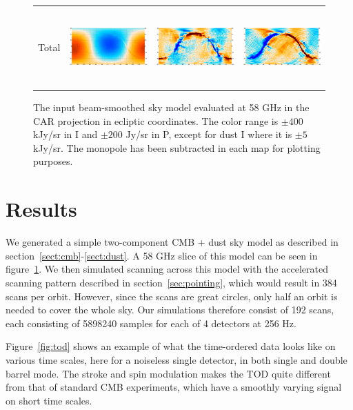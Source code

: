 \documentclass{article}
\begin{document}
\begin{figure}
\begin{tabular}{rm{56mm}m{54.4mm}m{56mm}}
		Total &
		\includegraphics[height=29.7mm,clip,trim=0 0mm 7.5mm 0]{plots/sim_freqmap_58GHz_0_0.png} &
		\includegraphics[height=29.7mm,clip,trim=7.5mm 0mm 7.5mm 0]{plots/sim_freqmap_58GHz_0_1.png} &
		\includegraphics[height=29.7mm,clip,trim=7.5mm 0mm 0 0]{plots/sim_freqmap_58GHz_0_2.png}
	\end{tabular}
	\caption{The input beam-smoothed sky model evaluated at 58 GHz in the CAR
	projection in ecliptic coordinates. The color range is
	$\pm 400$ kJy/sr in I and $\pm 200$ Jy/sr in P, except for dust I where it is
	$\pm 5$ kJy/sr. The monopole has been subtracted in each map for plotting purposes.}
	\label{fig:model}
\end{figure}


\section{Results}
\label{sect:results}
We generated a simple two-component CMB + dust sky model as described in
section~\ref{sect:cmb}-\ref{sect:dust}. A 58 GHz slice of this
model can be seen in figure~\ref{fig:model}. We then simulated
scanning across this model with the accelerated scanning pattern
described in section~\ref{sec:pointing}, which would result in 384
scans per orbit.
However, since the scans are great circles, only half an orbit
is needed to cover the whole sky. Our simulations therefore consist
of 192 scans, each consisting of 5898240 samples for each of 4
detectors at 256 Hz.

Figure~\ref{fig:tod} shows an example of what the time-ordered
data looks like on various time scales, here for a noiseless
single detector, in both single and double barrel mode. The
stroke and spin modulation makes the TOD quite different from
that of standard CMB experiments, which have a smoothly varying
signal on short time scales.
\end{document}
